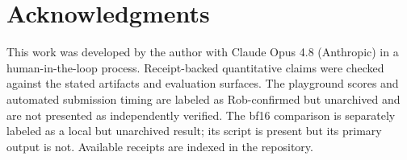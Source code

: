 \documentclass[11pt]{article}
\begin{document}
\section*{Acknowledgments}
This work was developed by the author with Claude Opus 4.8 (Anthropic) in a
human-in-the-loop process. Receipt-backed quantitative claims were checked against
the stated artifacts and evaluation surfaces. The playground scores and automated
submission timing are labeled as Rob-confirmed but unarchived and are not
presented as independently verified. The bf16 comparison is separately labeled
as a local but unarchived result; its script is present but its primary output is
not. Available receipts are indexed in the repository.
\end{document}
